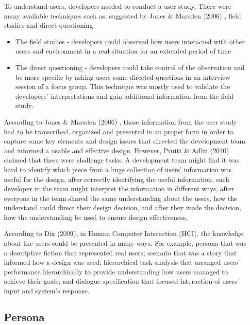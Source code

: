 To understand users, developers needed to conduct a user study. There were many available techniques such as, suggested by Jones \& Marsden (2006) \cite{jones2006mobile}, field studies and direct questioning

\begin{itemize} 
\item The field studies - developers could observed how users interacted with other users and environment in a real situation for an extended period of time
\item The direct questioning - developers could take control of the observation and be more specific by asking users some directed questions in an interview session of a focus group. This technique was mostly used to validate the developers' interpretations and gain additional information from the field study. 
\end{itemize}

According to Jones \& Marsden (2006) \cite{jones2006mobile}, those information from the user study had to be transcribed, organized and presented in an proper form in order to capture some key elements and design issues that directed the development team and informed a usable and effective design. However, Pruitt \& Adlin (2010) \cite{pruitt2010persona} claimed that these were challenge tasks. A development team might find it was hard to identify which piece from a huge collection of users' information was useful for the design, after correctly identifying the useful information, each developer in the team might interpret the information in different ways, after everyone in the team shared the same understanding about the users, how the understand could direct their design decision, and after they made the decision, how the understanding be used to ensure design effectiveness. 


According to Dix (2009), in Human Computer Interaction (HCI), the knowledge about the users could be presented in many ways. For example, persona that was a descriptive fiction that represented real users; scenario that was a story that informed how a design was used; hierarchical task analysis that arranged users' performance hierarchically to provide understanding how users managed to achieve their goals; and dialogue specification that focused interaction of users' input and system's response.

\subsection{Persona} 

